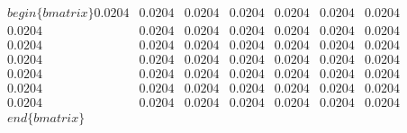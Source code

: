 \documentclass[preview]{standalone}
\begin{document}
\begin{align*}
\quad\\begin\{bmatrix\}0.0204 & 0.0204 & 0.0204 & 0.0204 & 0.0204 & 0.0204 & 0.0204 \quad\\ 0.0204 & 0.0204 & 0.0204 & 0.0204 & 0.0204 & 0.0204 & 0.0204 \quad\\ 0.0204 & 0.0204 & 0.0204 & 0.0204 & 0.0204 & 0.0204 & 0.0204 \quad\\ 0.0204 & 0.0204 & 0.0204 & 0.0204 & 0.0204 & 0.0204 & 0.0204 \quad\\ 0.0204 & 0.0204 & 0.0204 & 0.0204 & 0.0204 & 0.0204 & 0.0204 \quad\\ 0.0204 & 0.0204 & 0.0204 & 0.0204 & 0.0204 & 0.0204 & 0.0204 \quad\\ 0.0204 & 0.0204 & 0.0204 & 0.0204 & 0.0204 & 0.0204 & 0.0204\quad\\end\{bmatrix\}
\end{align*}
\end{document}
